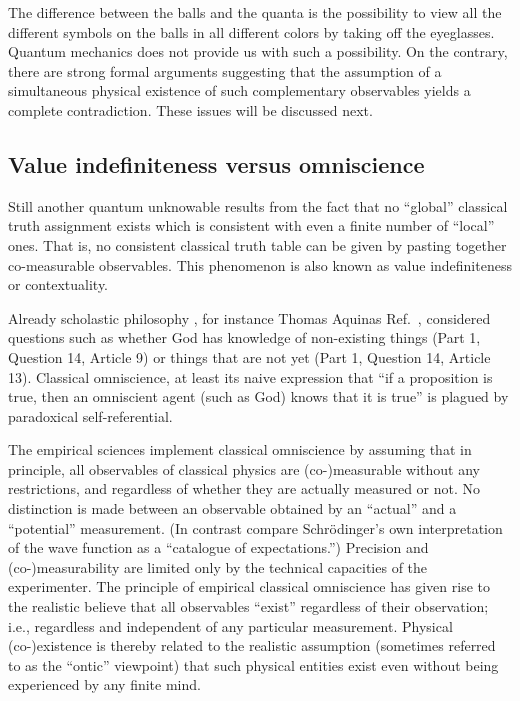\documentclass[rmp,amsfonts,showpacs,showkeys]{revtex4}
\begin{document}
The difference between the balls and the quanta is the possibility
to view all the different symbols on the balls
in all different colors by taking off the eyeglasses.
Quantum mechanics does not provide us with such a possibility.
On the contrary, there are strong formal arguments suggesting
that the assumption of a simultaneous
physical existence of such complementary observables yields a complete contradiction.
These issues will be discussed next.

\subsection{Value indefiniteness versus omniscience}

Still another quantum unknowable results from the fact that no ``global'' classical truth
assignment exists which is consistent with even a finite number of ``local'' ones.
That is, no consistent classical truth table can be given by pasting together co-measurable observables.
This phenomenon is also known as value indefiniteness or contextuality.

Already scholastic philosophy \cite{specker-60},
for instance Thomas Aquinas  Ref.~\cite{Aquinas},
considered questions such as whether God has knowledge of non-existing things
(Part 1, Question 14, Article 9) or things
that are not yet (Part 1, Question 14, Article 13).
Classical omniscience, at least its naive expression that
``if a proposition is true, then an omniscient agent (such as God) knows that it is true''
is plagued by paradoxical self-referential.

The empirical sciences implement classical omniscience by assuming that
in principle, all observables of classical physics are (co-)measurable without any restrictions,
and regardless of whether they are actually measured or not.
No distinction is made between an observable obtained by an ``actual'' and a ``potential'' measurement.
(In contrast compare Schr\"odinger's own interpretation of the wave function \cite[\S  7]{schrodinger} as a
``catalogue of expectations.'')
Precision and (co-)measurability are limited only by the technical capacities of the experimenter.
The principle of empirical classical omniscience has given rise to the realistic believe that
all observables ``exist'' regardless of their observation; i.e., regardless and independent of
any particular measurement.
Physical (co-)existence is thereby related to the realistic assumption \cite{stace}
(sometimes referred to as the ``ontic'' \cite{atman:05} viewpoint) that such physical entities exist
even without being experienced by any finite mind.
\end{document}

